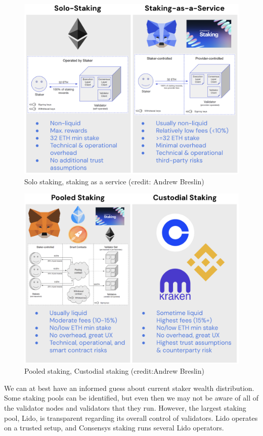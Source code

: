 \documentclass[UTF8]{article}
\begin{document}
{\begin{figure}[htbp]
\begin{center}
\includegraphics[width=0.7\linewidth]{images/solo-saas}
\caption{Solo staking, staking as a service (credit: Andrew Breslin)}
\label{fig:solo}
\end{center}
\end{figure}

\begin{figure}[htbp]
\begin{center}
\includegraphics[width=0.7\linewidth]{images/pooled-custodial}
\caption{Pooled staking, Custodial staking (credit:Andrew Breslin)}
\label{fig:pooled}
\end{center}
\end{figure}

We can at best have an informed guess about current staker wealth distribution. Some staking pools can be identified, but even then we may not be aware of all of the validator nodes and validators that they run. However, the largest staking pool, Lido, is transparent regarding its overall control of validators. Lido operates on a trusted setup, and Consensys staking runs several Lido operators. 


}
\end{document}
